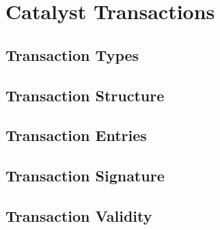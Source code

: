 \documentclass[a4paper, 12pt]{article}
\begin{document}



%


 \newpage
 
\section{Catalyst Transactions} \label{Cha:Tra}




\subsection{Transaction Types} \label{Sec:Typ}



\subsection{Transaction Structure} \label{Sec:TStru}




\subsection{Transaction Entries}\label{Sec:TEnt}



\subsection{Transaction Signature}\label{Sec:Sig}




\subsection{Transaction Validity} \label{Sec:Val}


\end{document}
